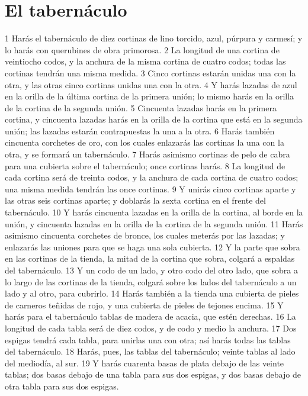 \section{El tabernáculo}

1 Harás el tabernáculo de diez cortinas de lino torcido, azul, púrpura y carmesí; y lo harás con querubines de obra primorosa.
2 La longitud de una cortina de veintiocho codos,  y la anchura de la misma cortina de cuatro codos; todas las cortinas tendrán una misma medida.
3 Cinco cortinas estarán unidas una con la otra, y las otras cinco cortinas unidas una con la otra.
4 Y harás lazadas de azul en la orilla de la última cortina de la primera unión; lo mismo harás en la orilla de la cortina de la segunda unión.
5 Cincuenta lazadas harás en la primera cortina, y cincuenta lazadas harás en la orilla de la cortina que está en la segunda unión; las lazadas estarán contrapuestas la una a la otra.
6 Harás también cincuenta corchetes de oro, con los cuales enlazarás las cortinas la una con la otra, y se formará un tabernáculo.
7 Harás asimismo cortinas de pelo de cabra para una cubierta sobre el tabernáculo; once cortinas harás.
8 La longitud de cada cortina será de treinta codos,  y la anchura de cada cortina de cuatro codos; una misma medida tendrán las once cortinas.
9 Y unirás cinco cortinas aparte y las otras seis cortinas aparte; y doblarás la sexta cortina en el frente del tabernáculo.
10 Y harás cincuenta lazadas en la orilla de la cortina, al borde en la unión, y cincuenta lazadas en la orilla de la cortina de la segunda unión.
11 Harás asimismo cincuenta corchetes de bronce, los cuales meterás por las lazadas; y enlazarás las uniones para que se haga una sola cubierta.
12 Y la parte que sobra en las cortinas de la tienda, la mitad de la cortina que sobra, colgará a espaldas del tabernáculo.
13 Y un codo   de un lado, y otro codo del otro lado, que sobra a lo largo de las cortinas de la tienda, colgará sobre los lados del tabernáculo a un lado y al otro, para cubrirlo.
14 Harás también a la tienda una cubierta de pieles de carneros teñidas de rojo, y una cubierta de pieles de tejones encima.
15 Y harás para el tabernáculo tablas de madera de acacia, que estén derechas.
16 La longitud de cada tabla será de diez codos,  y de codo y medio la anchura.
17 Dos espigas tendrá cada tabla, para unirlas una con otra; así harás todas las tablas del tabernáculo.
18 Harás, pues, las tablas del tabernáculo; veinte tablas al lado del mediodía, al sur.
19 Y harás cuarenta basas de plata debajo de las veinte tablas; dos basas debajo de una tabla para sus dos espigas, y dos basas debajo de otra tabla para sus dos espigas.
